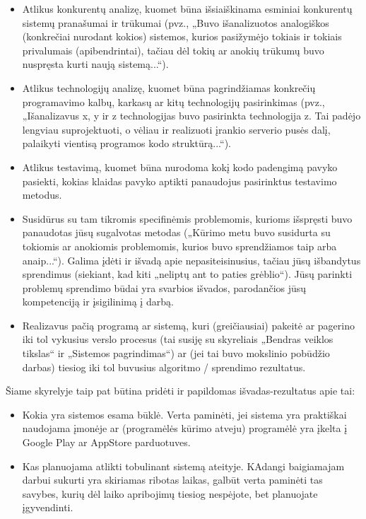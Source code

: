 \documentclass{ktuthesis}
\begin{document}
	\begin{itemize}[label={--}]
		\item Atlikus konkurentų analizę, kuomet būna išsiaiškinama esminiai konkurentų sistemų pranašumai ir trūkumai (pvz., „Buvo išanalizuotos analogiškos
		(konkrečiai nurodant kokios) sistemos, kurios pasižymėjo tokiais ir tokiais privalumais (apibendrintai), tačiau dėl tokių ar anokių trūkumų buvo
		nuspręsta kurti naują sistemą...“).
		\item Atlikus technologijų analizę, kuomet būna pagrindžiamas konkrečių programavimo kalbų, karkasų ar kitų technologijų pasirinkimas
		(pvz., „Išanalizavus x, y ir z technologijas buvo pasirinkta technologija z. Tai padėjo lengviau suprojektuoti, o vėliau ir realizuoti įrankio serverio
		pusės dalį, palaikyti vientisą programos kodo struktūrą...“).
		\item Atlikus testavimą, kuomet būna nurodoma kokį kodo padengimą pavyko pasiekti, kokias klaidas pavyko aptikti panaudojus pasirinktus testavimo metodus.
		\item Susidūrus su tam tikromis specifinėmis problemomis, kurioms išspręsti buvo panaudotas jūsų sugalvotas metodas („Kūrimo metu buvo susidurta su tokiomis
		ar anokiomis problemomis, kurios buvo sprendžiamos taip arba anaip...“). Galima įdėti ir išvadą apie nepasiteisinusius, tačiau jūsų išbandytus sprendimus
		(siekiant, kad kiti „neliptų ant to paties grėblio“). Jūsų parinkti problemų sprendimo būdai yra svarbios išvados, parodančios jūsų kompetenciją ir įsigilinimą į darbą.
		\item Realizavus pačią programą ar sistemą, kuri (greičiausiai) pakeitė ar pagerino iki tol vykusius verslo procesus (tai susiję su skyreliais „Bendras veiklos tikslas“
		ir „Sistemos pagrindimas“) ar (jei tai buvo mokslinio pobūdžio darbas) tiesiog iki tol buvusius algoritmo / sprendimo rezultatus.
	\end{itemize}
	
	Šiame skyrelyje taip pat būtina pridėti ir papildomas išvadas-rezultatus apie tai:
	\begin{itemize}[label={--}]
		\item Kokia yra sistemos esama būklė. Verta paminėti, jei sistema yra praktiškai naudojama įmonėje ar (programėlės kūrimo atveju) programėlė yra įkelta
		į Google Play ar AppStore parduotuves.
		\item Kas planuojama atlikti tobulinant sistemą ateityje. KAdangi baigiamajam darbui sukurti yra skiriamas ribotas laikas, galbūt verta paminėti tas savybes,
		kurių dėl laiko apribojimų tiesiog nespėjote, bet planuojate įgyvendinti.
	\end{itemize}
	
\end{document}
